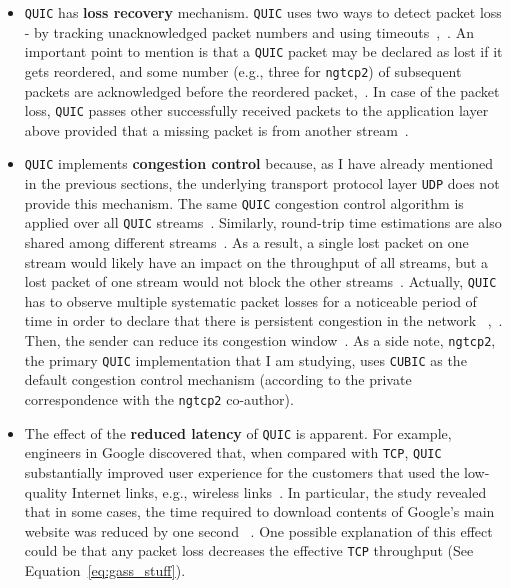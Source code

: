 \documentclass[12pt,a4paper]{report}
\begin{document}
\begin{itemize}
    
    
    \item  \texttt{QUIC} has \textbf{loss recovery} mechanism.
    \texttt{QUIC} uses two ways to detect packet loss - by tracking unacknowledged packet numbers and using timeouts~\cite{UnderstandQUIC},~\cite[Section~6]{ietf-quic-recovery-32}.
    An important point to mention is that a \texttt{QUIC} packet may be declared as lost if it gets reordered, and some number (e.g., three for \texttt{ngtcp2}) of subsequent packets are acknowledged before the reordered packet,~\cite[Section~6]{ietf-quic-recovery-32}.
    In case of the packet loss, \texttt{QUIC} passes other successfully received packets to the application layer above provided that a missing packet is from another stream~\cite{head-of-line-blocking-in-quic-and-http-3-the-details}.
   
   \item \texttt{QUIC} implements \textbf{congestion control} because, as I have already mentioned in the previous sections, the underlying transport protocol layer \texttt{UDP} does not provide this mechanism. 
   The same \texttt{QUIC} congestion control algorithm is applied over all \texttt{QUIC} streams~\cite{head-of-line-blocking-in-quic-and-http-3-the-details, UnderstandQUIC}.
   Similarly, round-trip time estimations are also shared among different streams~\cite[Section~4.2]{ietf-quic-recovery-32}.
   As a result, a single lost packet on one stream would likely have an impact on the throughput of all streams, but a lost packet of one stream would not block the other streams~\cite{head-of-line-blocking-in-quic-and-http-3-the-details, UnderstandQUIC}.
   Actually, \texttt{QUIC} has to observe multiple systematic packet losses for a noticeable period of time in order to declare that there is persistent congestion in the network ~\cite[Section~4]{ietf-quic-recovery-32},~\cite{UnderstandQUIC}.
   Then, the sender can reduce its congestion window~\cite{UnderstandQUIC}.
   As a side note, \texttt{ngtcp2}, the primary \texttt{QUIC} implementation that I am studying, uses \texttt{CUBIC} as the default congestion control mechanism (according to the private correspondence with the \texttt{ngtcp2} co-author).
  
  

 

  
  
  \item The effect of the \textbf{reduced latency} of \texttt{QUIC} is apparent.
  For example, engineers in Google discovered that, when compared with \texttt{TCP}, \texttt{QUIC} substantially improved user experience for the customers that used the low-quality Internet links, e.g., wireless links~\cite{chromium_blog_about_quic, quic-vs-tcptls-and-why-quic-is-not-the-next-big-thing}.
  In particular, the study revealed that in some cases, the time required to download contents of Google's main website was reduced by one second ~\cite{chromium_blog_about_quic}.
  One possible explanation of this effect could be that any packet loss decreases the effective \texttt{TCP} throughput (See Equation~\ref{eq:gass_stuff}).
  

\end{itemize}
\end{document}
